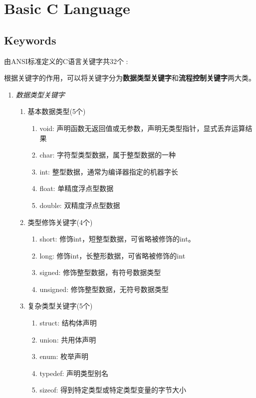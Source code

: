 \chapter{Basic C Language}\label{sec:basic_chapter}

\section{Keywords}
由ANSI标准定义的C语言关键字共32个 :




根据关键字的作用，可以将关键字分为\textbf{数据类型关键字}和\textbf{流程控制关键字}两大类。

\begin{enumerate}[label=\arabic*)]
	\item \emph{数据类型关键字}
	\begin{enumerate}
		\item 基本数据类型(5个)
		\begin{enumerate}
			\item void: 声明函数无返回值或无参数，声明无类型指针，显式丢弃运算结果
			\item char: 字符型类型数据，属于整型数据的一种
			\item int: 整型数据，通常为编译器指定的机器字长
			\item float: 单精度浮点型数据
			\item double: 双精度浮点型数据
		\end{enumerate}
		\item 类型修饰关键字(4个)
		\begin{enumerate}
			\item short: 修饰int，短整型数据，可省略被修饰的int。
			\item long: 修饰int，长整形数据，可省略被修饰的int
			\item signed: 修饰整型数据，有符号数据类型
			\item unsigned: 修饰整型数据，无符号数据类型
		\end{enumerate}
		\item 复杂类型关键字(5个)
		\begin{enumerate}
			\item struct: 结构体声明
			\item union: 共用体声明
			\item enum: 枚举声明
			\item typedef: 声明类型别名
			\item sizeof: 得到特定类型或特定类型变量的字节大小

\end{enumerate}
\end{enumerate}
\end{enumerate}
